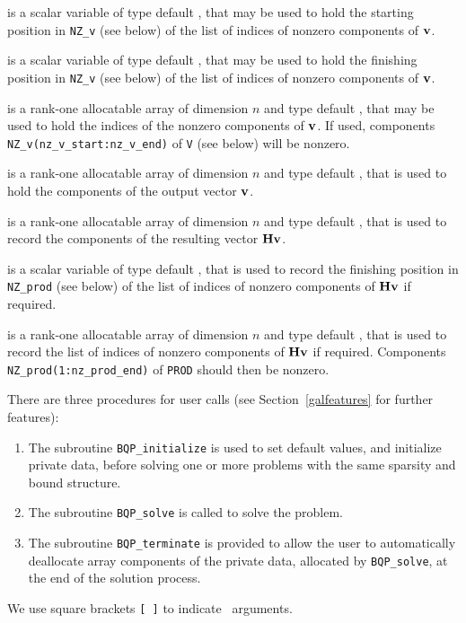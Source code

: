 \documentclass{galahad}
\newcommand{\packagename}{BQP}
\begin{document}
\begin{description}

 is a scalar variable of type default \integer, that 
may be used to hold the starting position in {\tt NZ\_v} (see below) 
of the list of indices of nonzero components of ${\mathbf{v}}$.

 is a scalar variable of type default \integer, that 
may be used to hold the finishing position in {\tt NZ\_v} (see below) 
of the list of indices of nonzero components of ${\mathbf{v}}$.

 is a rank-one allocatable array of dimension $n$
and type default \integer, that may be used to hold the indices of the
nonzero components of ${\mathbf{v}}$. If used, components 
{\tt NZ\_v(nz\_v\_start:nz\_v\_end)} of {\tt V} (see below) will be nonzero.

 is a rank-one allocatable array of dimension $n$
and type default \realdp, that is used to hold the components of the
output vector ${\mathbf{v}}$.

 is a rank-one allocatable array of dimension $n$
and type default \realdp, that is used to record the components of the
resulting vector ${\mathbf{H}} {\mathbf{v}}$.

 is a scalar variable of type default \integer, that 
is used to record the finishing position in {\tt NZ\_prod} (see below) 
of the list of indices of nonzero components of ${\mathbf{H}} {\mathbf{v}}$ if required.

 is a rank-one allocatable array of dimension $n$
and type default \integer, that is used to record the list of
indices of nonzero components of ${\mathbf{H}} {\mathbf{v}}$ if required. Components
{\tt NZ\_prod(1:nz\_prod\_end)} of {\tt PROD} should then be nonzero.

\end{description}


\galarguments
There are three procedures for user calls
(see Section~\ref{galfeatures} for further features): 

\begin{enumerate}
\item The subroutine 
      {\tt \packagename\_initialize} 
      is used to set default values, and initialize private data, 
      before solving one or more problems with the
      same sparsity and bound structure.
\item The subroutine 
      {\tt \packagename\_solve} 
      is called to solve the problem.
\item The subroutine 
      {\tt \packagename\_terminate} 
      is provided to allow the user to automatically deallocate array 
       components of the private data, allocated by 
       {\tt \packagename\_solve}, 
       at the end of the solution process. 
\end{enumerate}
We use square brackets {\tt [ ]} to indicate \optional\ arguments.
\end{document}

